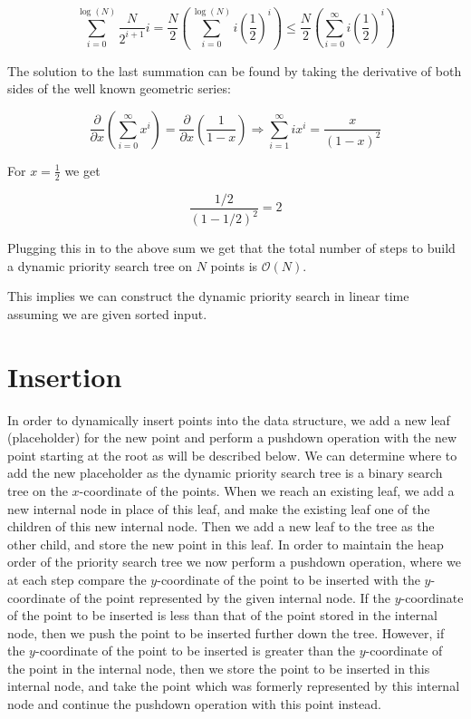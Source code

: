 \documentclass[twoside,11pt,openright]{report}
\begin{document}
$$\sum\limits_{i=0}^{\log(N)} \frac{N}{2^{i+1}}i = \frac{N}{2} \left( \sum\limits_{i=0}^{\log(N)} i\left(\frac{1}{2}\right)^i \right) \leq \frac{N}{2} \left( \sum\limits_{i=0}^{\infty} i\left(\frac{1}{2}\right)^i \right)$$

The solution to the last summation can be found by taking the derivative of both sides of the well known geometric series:

$$ \frac{\partial}{\partial x} \left( \sum\limits_{i=0}^{\infty} x^i \right) = \frac{\partial}{\partial x} \left( \frac{1}{1-x} \right) \Rightarrow \sum_{i=1}^{\infty} ix^i = \frac{x}{(1-x)^2} $$

For $x = \frac{1}{2}$ we get

$$\frac{1/2}{(1-1/2)^2} = 2$$

Plugging this in to the above sum we get that the total number of steps to build a dynamic priority search tree on $N$ points is $\mathcal{O}(N)$.

This implies we can construct the dynamic priority search in linear time assuming we are given sorted input.

\section{Insertion}

In order to dynamically insert points into the data structure, we add a new leaf (placeholder) for the new point and perform a pushdown operation with the new point starting at the root as will be described below. We can determine where to add the new placeholder as the dynamic priority search tree is a binary search tree on the $x$-coordinate of the points. When we reach an existing leaf, we add a new internal node in place of this leaf, and make the existing leaf one of the children of this new internal node. Then we add a new leaf to the tree as the other child, and store the new point in this leaf. In order to maintain the heap order of the priority search tree we now perform a pushdown operation, where we at each step compare the $y$-coordinate of the point to be inserted with the $y$-coordinate of the point represented by the given internal node. If the $y$-coordinate of the point to be inserted is less than that of the point stored in the internal node, then we push the point to be inserted further down the tree. However, if the $y$-coordinate of the point to be inserted is greater than the $y$-coordinate of the point in the internal node, then we store the point to be inserted in this internal node, and take the point which was formerly represented by this internal node and continue the pushdown operation with this point instead.
\end{document}
